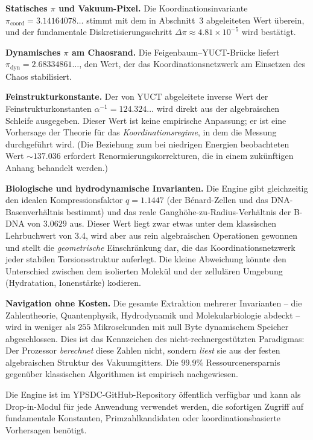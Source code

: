 \documentclass[12pt,a4paper]{article}
\begin{document}
	\textbf{Statisches $\pi$ und Vakuum-Pixel.} Die Koordinationsinvariante $\pi_{\mathrm{coord}} = 3.14164078\ldots$ stimmt mit dem in Abschnitt~3 abgeleiteten Wert überein, und der fundamentale Diskretisierungsschritt $\Delta\pi \approx 4.81\times10^{-5}$ wird bestätigt.
	
	\textbf{Dynamisches $\pi$ am Chaosrand.} Die Feigenbaum–YUCT-Brücke liefert $\pi_{\mathrm{dyn}} = 2.68334861\ldots$, den Wert, der das Koordinationsnetzwerk am Einsetzen des Chaos stabilisiert.
	
	\textbf{Feinstrukturkonstante.} Der von YUCT abgeleitete inverse Wert der Feinstrukturkonstanten $\alpha^{-1} = 124.324\ldots$ wird direkt aus der algebraischen Schleife ausgegeben. Dieser Wert ist keine empirische Anpassung; er ist eine Vorhersage der Theorie für das \emph{Koordinationsregime}, in dem die Messung durchgeführt wird. (Die Beziehung zum bei niedrigen Energien beobachteten Wert $\sim 137.036$ erfordert Renormierungskorrekturen, die in einem zukünftigen Anhang behandelt werden.)
	
	\textbf{Biologische und hydrodynamische Invarianten.} Die Engine gibt gleichzeitig den idealen Kompressionsfaktor $q = 1.1447$ (der Bénard-Zellen und das DNA-Basenverhältnis bestimmt) und das reale Ganghöhe-zu-Radius-Verhältnis der B-DNA von $3.0629$ aus. Dieser Wert liegt zwar etwas unter dem klassischen Lehrbuchwert von 3.4, wird aber aus rein algebraischen Operationen gewonnen und stellt die \emph{geometrische} Einschränkung dar, die das Koordinationsnetzwerk jeder stabilen Torsionsstruktur auferlegt. Die kleine Abweichung könnte den Unterschied zwischen dem isolierten Molekül und der zellulären Umgebung (Hydratation, Ionenstärke) kodieren.
	
	\textbf{Navigation ohne Kosten.} Die gesamte Extraktion mehrerer Invarianten – die Zahlentheorie, Quantenphysik, Hydrodynamik und Molekularbiologie abdeckt – wird in weniger als $255$ Mikrosekunden mit null Byte dynamischem Speicher abgeschlossen. Dies ist das Kennzeichen des nicht-rechnergestützten Paradigmas: Der Prozessor \emph{berechnet} diese Zahlen nicht, sondern \emph{liest} sie aus der festen algebraischen Struktur des Vakuumgitters. Die $99.9\%$ Ressourcenersparnis gegenüber klassischen Algorithmen ist empirisch nachgewiesen.
	
	Die Engine ist im YPSDC-GitHub-Repository öffentlich verfügbar und kann als Drop-in-Modul für jede Anwendung verwendet werden, die sofortigen Zugriff auf fundamentale Konstanten, Primzahlkandidaten oder koordinationsbasierte Vorhersagen benötigt.
	
\end{document}
